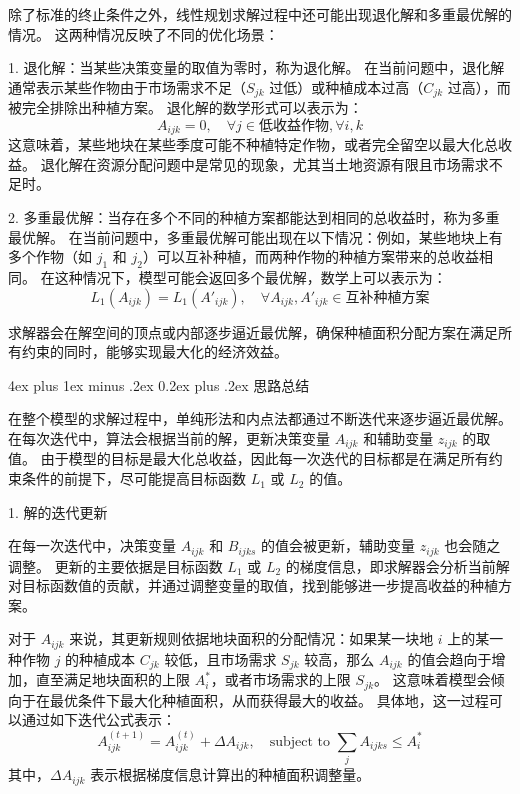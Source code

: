 \documentclass[12pt,a4paper]{nmmcm}
\makeatletter
\renewcommand\subsubsection{\@startsection{subsubsection}{3}{1em}%
  {4ex plus 1ex minus .2ex}%
  {0.2ex plus .2ex}%
  {\normalfont\large\bfseries}}
\makeatother
\begin{document}
除了标准的终止条件之外，线性规划求解过程中还可能出现退化解和多重最优解的情况。
这两种情况反映了不同的优化场景：

1. 退化解：当某些决策变量的取值为零时，称为退化解。
在当前问题中，退化解通常表示某些作物由于市场需求不足（$S_{jk}$ 过低）或种植成本过高（$C_{jk}$ 过高），而被完全排除出种植方案。
退化解的数学形式可以表示为：
\[
  A_{ijk} = 0, \quad \forall j \in \text{低收益作物}, \forall i, k
\]
这意味着，某些地块在某些季度可能不种植特定作物，或者完全留空以最大化总收益。
退化解在资源分配问题中是常见的现象，尤其当土地资源有限且市场需求不足时。


2. 多重最优解：当存在多个不同的种植方案都能达到相同的总收益时，称为多重最优解。
在当前问题中，多重最优解可能出现在以下情况：例如，某些地块上有多个作物（如 $j_1$ 和 $j_2$）可以互补种植，而两种作物的种植方案带来的总收益相同。
在这种情况下，模型可能会返回多个最优解，数学上可以表示为：
\[
  L_1(A_{ijk}) = L_1(A'_{ijk}), \quad \forall A_{ijk}, A'_{ijk} \in \text{互补种植方案}
\]

求解器会在解空间的顶点或内部逐步逼近最优解，确保种植面积分配方案在满足所有约束的同时，能够实现最大化的经济效益。


\subsubsection{思路总结}

在整个模型的求解过程中，单纯形法和内点法都通过不断迭代来逐步逼近最优解。
在每次迭代中，算法会根据当前的解，更新决策变量 $A_{ijk}$ 和辅助变量 $z_{ijk}$ 的取值。
由于模型的目标是最大化总收益，因此每一次迭代的目标都是在满足所有约束条件的前提下，尽可能提高目标函数 $L_1$ 或 $L_2$ 的值。


1. 解的迭代更新

在每一次迭代中，决策变量 $A_{ijk}$ 和 $B_{ijks}$ 的值会被更新，辅助变量 $z_{ijk}$ 也会随之调整。
更新的主要依据是目标函数 $L_1$ 或 $L_2$ 的梯度信息，即求解器会分析当前解对目标函数值的贡献，并通过调整变量的取值，找到能够进一步提高收益的种植方案。


对于 $A_{ijk}$ 来说，其更新规则依据地块面积的分配情况：如果某一块地 $i$ 上的某一种作物 $j$ 的种植成本 $C_{jk}$ 较低，且市场需求 $S_{jk}$ 较高，那么 $A_{ijk}$ 的值会趋向于增加，直至满足地块面积的上限 $A_i^*$，或者市场需求的上限 $S_{jk}$。
这意味着模型会倾向于在最优条件下最大化种植面积，从而获得最大的收益。
具体地，这一过程可以通过如下迭代公式表示：
\[
  A_{ijk}^{(t+1)} = A_{ijk}^{(t)} + \Delta A_{ijk}, \quad \text{subject to } \sum_j A_{ijks} \leq A_i^*
\]
其中，$\Delta A_{ijk}$ 表示根据梯度信息计算出的种植面积调整量。
\end{document}
